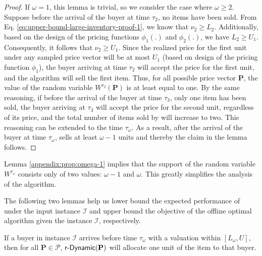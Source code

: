 \begin{proof}
If $\omega = 1$, this lemma is trivial, so we consider the case where $\omega \geq 2$. 
Suppose before the arrival of the buyer at time $\tau_{2}$, no items have been sold. 
From Eq. \eqref{eq:upper-bound-large-inventory-proof-1}, we know that $\nu_{2} \geq L_{2}$. 
Additionally, based on the design of the pricing functions $\phi_{1}(.)$ and $\phi_{2}(.)$, we have $L_{2} \geq U_{1}$. 
Consequently, it follows that $\nu_{2} \geq U_{1}$. Since the realized price for the first unit under any sampled price vector will be at most $U_{1}$ (based on design of the pricing function $\phi_{1}$), 
the buyer arriving at time $\tau_{2}$ will accept the price for the first unit, and the algorithm will sell the first item.
Thus, for all possible price vector $\mathbf{P}$, the value of the random variable $W^{\tau_{2}}(\mathbf{P})$ is at least equal to one. 
By the same reasoning, if before the arrival of the buyer at time $\tau_{3}$, only one item has been sold, the buyer arriving at $\tau_{3}$ will accept the price for the second unit, regardless of its price, and the total number of  items sold by \rDynamic will increase to two. 
This reasoning can be extended to the time $\tau_{\omega}$. As a result, after the arrival of the buyer at time $\tau_{\omega}$, \rDynamic sells at least $\omega-1$ units and thereby the claim in the lemma follows.
\end{proof}

Lemma \ref{appendix:prop:omega-1} implies that the support of the random variable $ W^{\tau_{\omega}} $ consists only of two values: $\omega-1$ and $\omega$. This greatly simplifies the analysis of the algorithm. 


The following two lemmas help us lower bound the expected performance of \rDynamic under the input instance $\mathcal{I}$ and upper bound the objective of the offline optimal algorithm given the instance $\mathcal{I}$, respectively. 


\begin{lemma}\label{appendix:prop:main:claim3-upper-bound-kselection-cost}
    If a buyer in instance $\mathcal{I}$ arrives before time $\tau_{\omega}$ with a valuation within $[L_{\omega}, U]$, then for all $\mathbf{P} \in \mathcal{P}$, $ \textsf{r-Dynamic}(\mathbf{P}) $ will allocate one unit of the item to that buyer.
\end{lemma}


